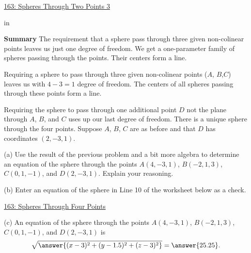 \documentclass{ximera}
\newcommand{\pskip}{\vskip 0.1 in}
\begin{document}
\begin{question}
\begin{onlineOnly}
    \begin{center}
\end{center}
\end{onlineOnly}

\href{https://www.desmos.com/3d/zkltopagls}{163: Spheres Through Two Points 3}

\pskip

{\bf Summary} The requirement that a sphere pass through three given non-colinear points leaves us just one degree of freedom. We get a one-parameter family of spheres passing through the points. Their centers form a line.
\end{question}


\begin{question}  \label{Q:9df3gyhuuu}
Requiring a sphere to pass through three given non-colinear points ($A$, $B$,$C$) leaves us with $4-3 = 1$ degree of freedom. The centers of all spheres passing through these points form a line. %

Requiring the sphere to pass through one additional point $D$ not the plane through $A$, $B$, and $C$ uses up our last degree of freedom. There is a unique sphere through the four points. Suppose $A$, $B$, $C$ are as before and that $D$ has coordinates $(2,-3,1)$.

\begin{freeResponse}
(a) Use the result of the previous problem and a bit more algebra to determine an equation of the sphere through the points $A(4,-3,1)$, $B(-2,1,3)$, $C(0,1,-1)$, and $D(2,-3,1)$. Explain your reasoning.
\end{freeResponse}

(b) Enter an equation of the sphere in Line 10 of the worksheet below as a check.

\begin{onlineOnly}
    \begin{center}
\end{center}
\end{onlineOnly}

\href{https://www.desmos.com/3d/islhwrjogm}{163: Spheres Through Four Points}


(c) An equation of the sphere through the points $A(4,-3,1)$, $B(-2,1,3)$, $C(0,1,-1)$, and $D(2,-3,1)$ is
\[
   \sqrt{ \answer{(x-3)^2 + (y-1.5)^2 + (z-3)^2}} = \answer{25.25} .
\]

\end{question}
\end{document}
